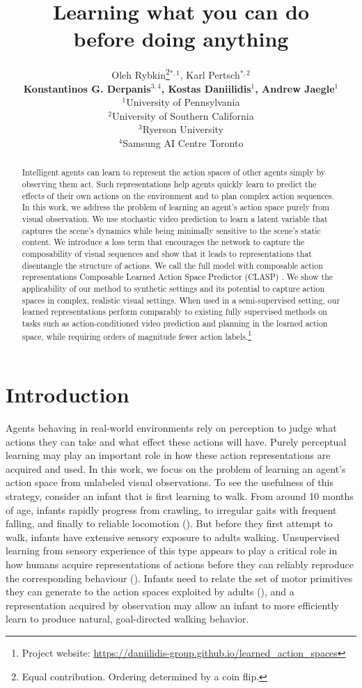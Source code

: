 \documentclass{article} %
\title{Learning what you can do \\ before doing anything}
\author{Oleh Rybkin\thanks{Equal contribution. Ordering determined by a coin flip.}$^{*,1}$, Karl Pertsch$^{*,2}$ \\
\textbf{Konstantinos G. Derpanis$^{3,4}$, Kostas Daniilidis$^{1}$, Andrew Jaegle$^{1}$}  \\
$^{1}$University of Pennsylvania\\
$^{2}$University of Southern California \\
$^{3}$Ryerson University \\
$^{4}$Samsung AI Centre Toronto \\
}
\begin{document}
\maketitle

\begin{abstract}
Intelligent agents can learn to represent the action spaces of other agents simply by observing them act. Such representations help agents quickly learn to predict the effects of their own actions on the environment and to plan complex action sequences. 
In this work, we address the problem of learning an agent’s action space purely from visual observation. We use stochastic video prediction to learn a latent variable that captures the scene's dynamics while being minimally sensitive to the scene's static content. 
We introduce a loss term that encourages the network to capture the composability of visual sequences and show that it leads to representations that disentangle the structure of actions. We call the full model with composable action representations Composable Learned Action Space Predictor (CLASP) . We show the applicability of our method to synthetic settings and its potential to capture action spaces in complex, realistic visual settings. When used in a semi-supervised setting, our learned representations perform comparably to existing fully supervised methods on tasks such as action-conditioned video prediction and planning in the learned action space, while requiring orders of magnitude fewer action labels.\footnote{Project website: \url{https://daniilidis-group.github.io/learned_action_spaces}}
\end{abstract}


\section{Introduction}


Agents behaving in real-world environments rely on perception to judge what actions they can take and what effect these actions will have. Purely perceptual learning may play an important role in how these action representations are acquired and used. In this work, we focus on the problem of learning an agent’s action space from unlabeled visual observations. To see the usefulness of this strategy, consider an infant that is first learning to walk. From around 10 months of age, infants rapidly progress from crawling, to irregular gaits with frequent falling, and finally to reliable locomotion (\cite{Adolph2012Walk}). 
But before they first attempt to walk, infants have extensive sensory exposure to adults walking. Unsupervised learning from sensory experience of this type appears to play a critical role in how humans acquire representations of actions before they can reliably reproduce the corresponding behaviour (\cite{Ullman18215}). Infants need to relate the set of motor primitives they can generate to the action spaces exploited by adults (\cite{Dominici2011Locomotor}), and a representation acquired by observation may allow an infant to more efficiently learn to produce natural, goal-directed walking behavior. 
\end{document}
